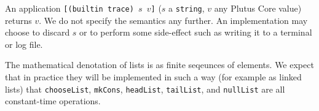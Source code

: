 \label{note:trace}
An application \texttt{[(builtin trace) $s$ $v$]} ($s$ a \texttt{string}, $v$
any Plutus Core value) returns $v$.  We do not specify the semantics any
further.  An implementation may choose to discard $s$ or to perform some
side-effect such as writing it to a terminal or log file.

\label{note:list-semantics}
The mathematical denotation of lists is as finite seqeunces of elements.  We
expect that in practice they will be implemented in such a way (for example as
linked lists)
that \texttt{chooseList}, \texttt{mkCons}, \texttt{headList}, \texttt{tailList},
and \texttt{nullList} are all constant-time operations.
\newpage
